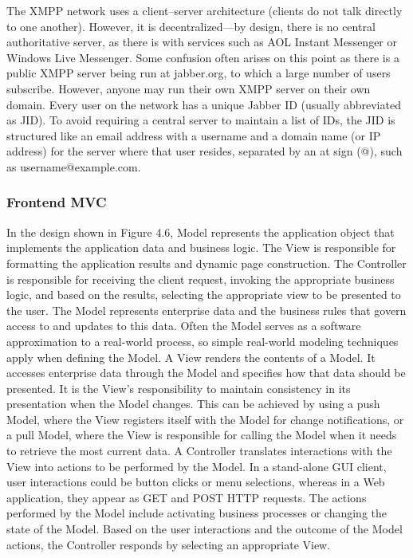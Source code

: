       The XMPP network uses a client–server architecture (clients do not talk directly to one another). However, it is decentralized—by design, there is no central authoritative server, as there is with services such as AOL Instant Messenger or Windows Live Messenger. Some confusion often arises on this point as there is a public XMPP server being run at jabber.org, to which a large number of users subscribe. However, anyone may run their own XMPP server on their own domain.
      Every user on the network has a unique Jabber ID (usually abbreviated as JID). To avoid requiring a central server to maintain a list of IDs, the JID is structured like an email address with a username and a domain name (or IP address) for the server where that user resides, separated by an at sign (@), such as username@example.com.

  \subsubsection{Frontend MVC}
     In the design shown in Figure 4.6, Model represents the application object that implements the application data and business logic. The View is responsible for formatting the application results and dynamic page construction. The Controller is responsible for receiving the client request, invoking the appropriate business logic, and based on the results, selecting the appropriate view to be presented to the user. The Model represents enterprise data and the business rules that govern access to and updates to this data. Often the Model serves as a software approximation to a real-world process, so simple real-world modeling techniques apply when defining the Model. A View renders the contents of a Model. It accesses enterprise data through the Model and specifies how that data should be presented. It is the View's responsibility to maintain consistency in its presentation when the Model changes. This can be achieved by using a push Model, where the View registers itself with the Model for change notifications, or a pull Model, where the View is responsible for calling the Model when it needs to retrieve the most current data. A Controller translates interactions with the View into actions to be performed by the Model. In a stand-alone GUI client, user interactions could be button clicks or menu selections, whereas in a Web application, they appear as GET and POST HTTP requests. The actions performed by the Model include activating business processes or changing the state of the Model. Based on the user interactions and the outcome of the Model actions, the Controller responds by selecting an appropriate View. 
